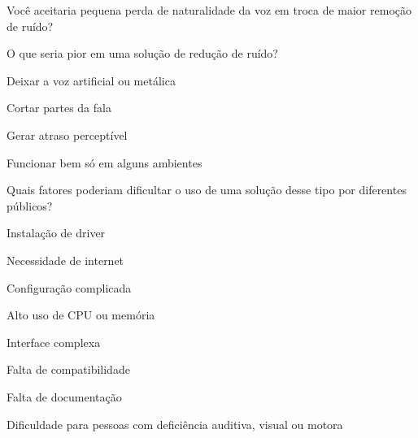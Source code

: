 \begin{perguntaFormulario}{Você aceitaria pequena perda de naturalidade da voz em troca de maior remoção de ruído?}
\end{perguntaFormulario}

\begin{perguntaFormulario}{O que seria pior em uma solução de redução de ruído?}
\begin{opcoesFormulario}
    \item Deixar a voz artificial ou metálica
    \item Cortar partes da fala
    \item Gerar atraso perceptível
    \item Funcionar bem só em alguns ambientes
\end{opcoesFormulario}
\end{perguntaFormulario}


\begin{perguntaFormulario}{Quais fatores poderiam dificultar o uso de uma solução desse tipo por diferentes públicos?}
\begin{opcoesFormularioDuasColunas}
    \item Instalação de driver
    \item Necessidade de internet
    \item Configuração complicada
    \item Alto uso de CPU ou memória
    \item Interface complexa
    \item Falta de compatibilidade
    \item Falta de documentação
    \item Dificuldade para pessoas com deficiência auditiva, visual ou motora
\end{opcoesFormularioDuasColunas}
\end{perguntaFormulario}

